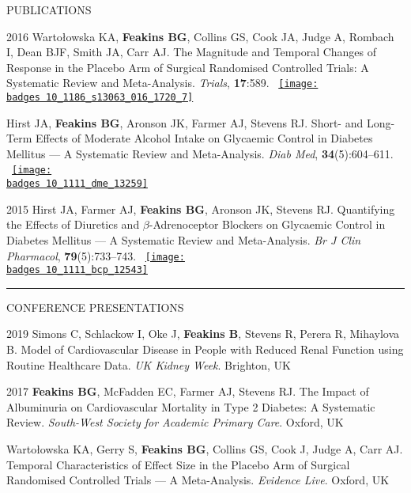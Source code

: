 \documentclass[10pt,a4paper]{article}
\def\badges{./badges/}
\begin{document}
\begin{cvlist}{PUBLICATIONS}
	\item[2016]
	Warto\l{}owska KA, \textbf{Feakins BG}, Collins GS, Cook JA, Judge A, Rombach I, Dean BJF, Smith JA, Carr AJ. The Magnitude and Temporal Changes of Response in the Placebo Arm of Surgical Randomised Controlled Trials: A Systematic Review and Meta-Analysis. \textit{Trials}, \textbf{17}:589. ~\href{https://biomedcentral.altmetric.com/details/14679542}{\texttt{[image: \\badges 10\_1186\_s13063\_016\_1720\_7]}}
	
	\item[]
	Hirst JA, \textbf{Feakins BG}, Aronson JK, Farmer AJ, Stevens RJ. Short- and Long-Term Effects of Moderate Alcohol Intake on Glycaemic Control in Diabetes Mellitus --- A Systematic Review and Meta-Analysis. \textit{Diab Med}, \textbf{34}(5):604--611. ~\href{https://wiley.altmetric.com/details/11898077}{\texttt{[image: \\badges 10\_1111\_dme\_13259]}}
	
	\item[2015]
	Hirst JA, Farmer AJ, \textbf{Feakins BG}, Aronson JK, Stevens RJ. Quantifying the Effects of Diuretics and $\beta$-Adrenoceptor Blockers on Glycaemic Control in Diabetes Mellitus --- A Systematic Review and Meta-Analysis. \textit{Br J Clin Pharmacol}, \textbf{79}(5):733--743. ~\href{https://wiley.altmetric.com/details/2869563}{\texttt{[image: \\badges 10\_1111\_bcp\_12543]}}
	
\end{cvlist}


\noindent\rule{\textwidth}{0.4pt}
\begin{cvlist}{CONFERENCE PRESENTATIONS}
	
	\item[2019]
	Simons C, Schlackow I, Oke J, \textbf{Feakins B}, Stevens R, Perera R, Mihaylova B. Model of Cardiovascular Disease in People with Reduced Renal Function using Routine Healthcare Data. \textit{UK Kidney Week}. Brighton, UK
	
	\item[2017]
	\textbf{Feakins BG}, McFadden EC, Farmer AJ, Stevens RJ. The Impact of Albuminuria on Cardiovascular Mortality in Type 2 Diabetes: A Systematic Review. \textit{South-West Society for Academic Primary Care}. Oxford, UK
	
	\item[]
	Warto\l{}owska KA, Gerry S, \textbf{Feakins BG}, Collins GS, Cook J, Judge A, Carr AJ. Temporal Characteristics of Effect Size in the Placebo Arm of Surgical Randomised Controlled Trials --- A Meta-Analysis. \textit{Evidence Live}. Oxford, UK
	
\end{cvlist}
\end{document}
